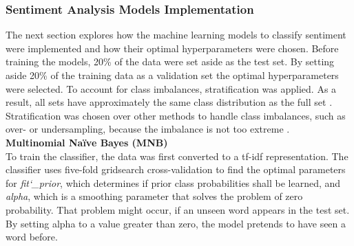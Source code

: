 \documentclass[11pt, a4paper]{article}
\begin{document}
\subsubsection{Sentiment Analysis Models Implementation}
The next section explores how the machine learning models to classify sentiment were implemented and how their optimal hyperparameters were chosen.
Before training the models, 20\% of the data were set aside as the test set. By setting aside 20\% of the training data as a validation set 
the optimal hyperparameters were selected. To account for class imbalances, stratification was applied. As a result, all sets have approximately the same
class distribution as the full set \citep{sahu2017stratification}.
Stratification was chosen over other methods to handle class imbalances, such as over- or undersampling, because the imbalance
is not too extreme \citep{ganganwar2012overview}.\\

\noindent\textbf{Multinomial Naïve Bayes (MNB)}\\
To train the classifier, the data was first converted to a tf-idf representation.
The classifier uses five-fold gridsearch cross-validation to find the optimal parameters for
\emph{fit\char`_prior}, which determines if prior class probabilities shall be learned, and \emph{alpha}, which is a smoothing parameter that solves
the problem of zero probability. That problem might occur, if an unseen word appears in the test set. By setting alpha to a value greater than
zero, the model pretends to have seen a word before.\\
\end{document}
